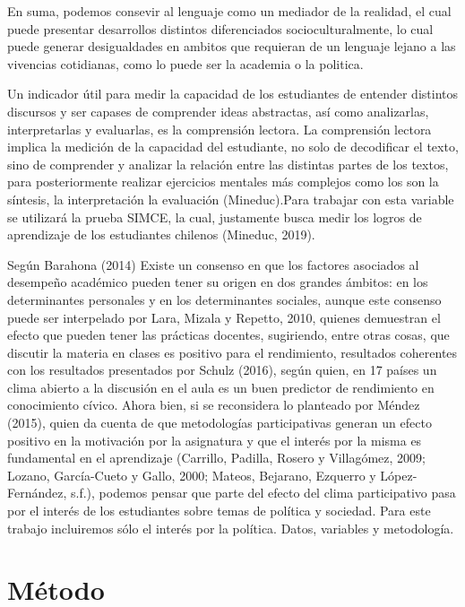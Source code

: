 \documentclass[
]{article}
\begin{document}
En suma, podemos consevir al lenguaje como un mediador de la realidad,
el cual puede presentar desarrollos distintos diferenciados
socioculturalmente, lo cual puede generar desigualdades en ambitos que
requieran de un lenguaje lejano a las vivencias cotidianas, como lo
puede ser la academia o la politica.

Un indicador útil para medir la capacidad de los estudiantes de entender
distintos discursos y ser capases de comprender ideas abstractas, así
como analizarlas, interpretarlas y evaluarlas, es la comprensión
lectora. La comprensión lectora implica la medición de la capacidad del
estudiante, no solo de decodificar el texto, sino de comprender y
analizar la relación entre las distintas partes de los textos, para
posteriormente realizar ejercicios mentales más complejos como los son
la síntesis, la interpretación la evaluación (Mineduc).Para trabajar con
esta variable se utilizará la prueba SIMCE, la cual, justamente busca
medir los logros de aprendizaje de los estudiantes chilenos (Mineduc,
2019).

Según Barahona (2014) Existe un consenso en que los factores asociados
al desempeño académico pueden tener su origen en dos grandes ámbitos: en
los determinantes personales y en los determinantes sociales, aunque
este consenso puede ser interpelado por Lara, Mizala y Repetto, 2010,
quienes demuestran el efecto que pueden tener las prácticas docentes,
sugiriendo, entre otras cosas, que discutir la materia en clases es
positivo para el rendimiento, resultados coherentes con los resultados
presentados por Schulz (2016), según quien, en 17 países un clima
abierto a la discusión en el aula es un buen predictor de rendimiento en
conocimiento cívico. Ahora bien, si se reconsidera lo planteado por
Méndez (2015), quien da cuenta de que metodologías participativas
generan un efecto positivo en la motivación por la asignatura y que el
interés por la misma es fundamental en el aprendizaje (Carrillo,
Padilla, Rosero y Villagómez, 2009; Lozano, García-Cueto y Gallo, 2000;
Mateos, Bejarano, Ezquerro y López-Fernández, s.f.), podemos pensar que
parte del efecto del clima participativo pasa por el interés de los
estudiantes sobre temas de política y sociedad. Para este trabajo
incluiremos sólo el interés por la política. Datos, variables y
metodología.

\hypertarget{muxe9todo}{%
\section{Método}\label{muxe9todo}}
\end{document}
